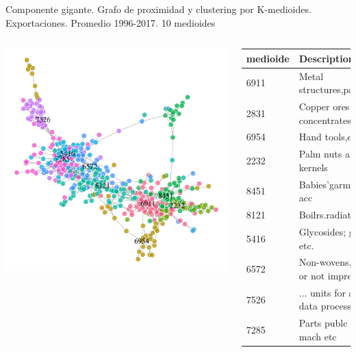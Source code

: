 \documentclass[compress]{beamer}
\begin{document}
\begin{frame}
\small{Componente gigante. Grafo de proximidad y clustering por K-medioides. Exportaciones. Promedio 1996-2017. 10 medioides}
\begin{columns}[c] 


\includegraphics[width=\linewidth]{pam10_gigant}


\tiny
\begin{table}
\centering
\begin{tabular}{ll}
\hline
medioide & Description \\ 
\hline
6911 & Metal structures,parts \\ 
2831 & Copper ores and concentrates \\ 
6954 & Hand tools,etc. nes \\ 
2232 & Palm nuts and kernels \\ 
8451 & Babies'garmnts,clths acc \\ 
8121 & Boilrs.radiatrs,etc.n.el \\ 
5416 & Glycosides; glands etc. \\ 
6572 & Non-wovens, whether or not impregnated \\ 
7526 & ... units for automatic data processing \\ 
7285 & Parts publc wrk mach etc \\ 
\hline
\end{tabular}
\end{table}

\end{columns}

\end{frame}
\end{document}
